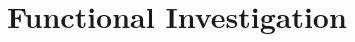\documentclass[thesis.tex]{subfiles}
\begin{document}
\chapter{Functional Investigation}
\label{ch:functional}
\end{document}
